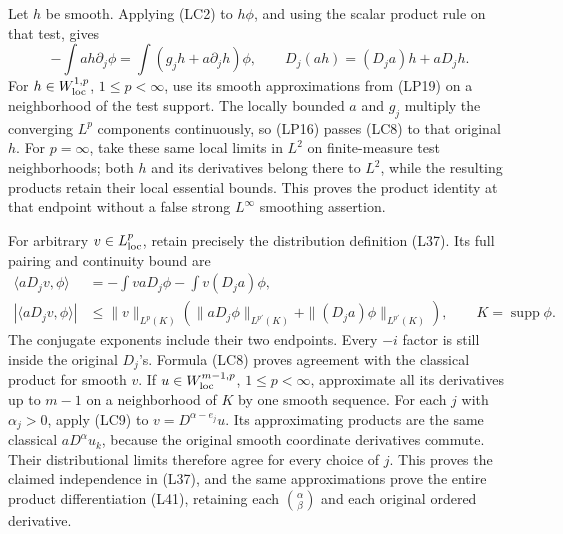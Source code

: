 \documentclass[
  11pt,
]{article}
\begin{document}
Let \(h\) be smooth. Applying (LC2) to \(h\phi\), and using the scalar
product rule on that test, gives \[
 -\int ah\partial_j\phi
       =\int(g_jh+a\partial_jh)\phi,\qquad
 D_j(ah)=(D_j a)h+aD_jh.                                       \tag{LC8}
\] For \(h\in W^{1,p}_{\rm loc}\), \(1\leq p<\infty\), use its smooth
approximations from (LP19) on a neighborhood of the test support. The
locally bounded \(a\) and \(g_j\) multiply the converging \(L^p\)
components continuously, so (LP16) passes (LC8) to that original \(h\).
For \(p=\infty\), take these same local limits in \(L^2\) on
finite-measure test neighborhoods; both \(h\) and its derivatives belong
there to \(L^2\), while the resulting products retain their local
essential bounds. This proves the product identity at that endpoint
without a false strong \(L^\infty\) smoothing assertion.

For arbitrary \(v\in L^p_{\rm loc}\), retain precisely the distribution
definition (L37). Its full pairing and continuity bound are \[
 \begin{split}
 \langle aD_jv,\phi\rangle
 &=-\int v aD_j\phi-\int v(D_j a)\phi,\\
 |\langle aD_jv,\phi\rangle|
 &\leq\|v\|_{L^p(K)}
     \left(\|aD_j\phi\|_{L^{p'}(K)}
                    +\|(D_j a)\phi\|_{L^{p'}(K)}\right),
 \qquad K=\operatorname{supp}\phi .
 \end{split}                                                   \tag{LC9}
\] The conjugate exponents include their two endpoints. Every \(-i\)
factor is still inside the original \(D_j\)'s. Formula (LC8) proves
agreement with the classical product for smooth \(v\). If
\(u\in W^{m-1,p}_{\rm loc}\), \(1\leq p<\infty\), approximate all its
derivatives up to \(m-1\) on a neighborhood of \(K\) by one smooth
sequence. For each \(j\) with \(\alpha_j>0\), apply (LC9) to
\(v=D^{\alpha-e_j}u\). Its approximating products are the same classical
\(aD^\alpha u_k\), because the original smooth coordinate derivatives
commute. Their distributional limits therefore agree for every choice of
\(j\). This proves the claimed independence in (L37), and the same
approximations prove the entire product differentiation (L41), retaining
each \(\binom{\alpha}{\beta}\) and each original ordered derivative.
\end{document}
